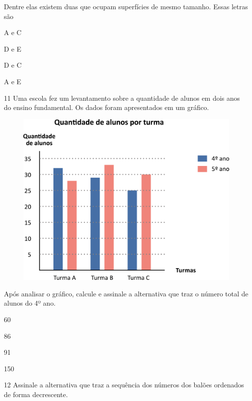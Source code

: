 \pagebreak
Dentre elas existem duas que ocupam superfícies de mesmo tamanho. Essas letras são

\begin{escolha}
\item
  A e C
\item
  D e E
\item
  D e C
\item
  A e E
\end{escolha}

\num{11} Uma escola fez um levantamento sobre a quantidade de alunos em dois anos
do ensino fundamental. Os dados foram apresentados em um gráfico.

\begin{figure}[htpb!]
\centering
\includegraphics[width=\textwidth]{./media/image97.png}
\end{figure}

\pagebreak
Após analisar o gráfico, calcule e assinale a alternativa que traz o número total de alunos do 4º ano.

\begin{escolha}
\item
  60
\item
  86
\item
  91
\item
  150
\end{escolha}

\num{12} Assinale a alternativa que traz a sequência dos números dos balões ordenados de forma decrescente.


